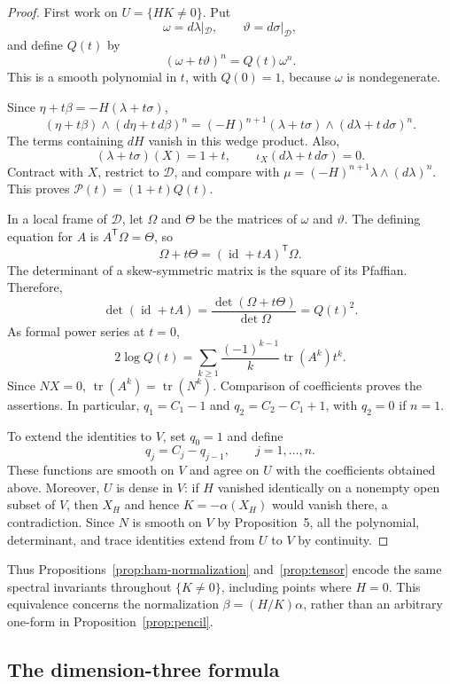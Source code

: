 \documentclass[11pt,a4paper]{article}
\numberwithin{equation}{section}
\theoremstyle{definition}
\theoremstyle{remark}
\newcommand{\id}{\operatorname{id}}
\newcommand{\tr}{\operatorname{tr}}
\begin{document}
\begin{proof}
First work on $U=\lbrace HK\neq 0\rbrace$.
Put
\[
\omega=d\lambda|_{\mathcal D},\qquad
\vartheta=d\sigma|_{\mathcal D},
\]
and define $Q(t)$ by
\[
(\omega+t\vartheta)^n=Q(t)\omega^n.
\]
This is a smooth polynomial in $t$, with $Q(0)=1$,
because $\omega$ is nondegenerate.

Since $\eta+t\beta=-H(\lambda+t\sigma)$,
\[
(\eta+t\beta)\wedge(d\eta+t\,d\beta)^n
=(-H)^{n+1}
(\lambda+t\sigma)\wedge(d\lambda+t\,d\sigma)^n.
\]
The terms containing $dH$ vanish in this wedge product.
Also,
\[
(\lambda+t\sigma)(X)=1+t,\qquad
\iota_X(d\lambda+t\,d\sigma)=0.
\]
Contract with $X$, restrict to $\mathcal D$, and compare
with $\mu=(-H)^{n+1}\lambda\wedge(d\lambda)^n$.
This proves $\mathcal P(t)=(1+t)Q(t)$.

In a local frame of $\mathcal D$, let $\Omega$ and
$\Theta$ be the matrices of $\omega$ and $\vartheta$.
The defining equation for $A$ is
$A^{\mathsf T}\Omega=\Theta$, so
\[
\Omega+t\Theta=(\id+tA)^{\mathsf T}\Omega.
\]
The determinant of a skew-symmetric matrix is the
square of its Pfaffian. Therefore,
\[
\det(\id+tA)
=\frac{\det(\Omega+t\Theta)}{\det\Omega}
=Q(t)^2.
\]
As formal power series at $t=0$,
\[
2\log Q(t)
=\sum_{k\geq1}\frac{(-1)^{k-1}}{k}
\tr(A^k)t^k.
\]
Since $NX=0$, $\tr(A^k)=\tr(N^k)$.
Comparison of coefficients proves the assertions.
In particular, $q_1=C_1-1$ and
$q_2=C_2-C_1+1$, with $q_2=0$ if $n=1$.

To extend the identities to $V$, set $q_0=1$ and define
\[
q_j=C_j-q_{j-1},\qquad j=1,\ldots,n.
\]
These functions are smooth on $V$ and agree on $U$ with
the coefficients obtained above. Moreover, $U$ is dense
in $V$: if $H$ vanished identically on a nonempty open
subset of $V$, then $X_H$ and hence
$K=-\alpha(X_H)$ would vanish there, a contradiction.
Since $N$ is smooth on $V$ by Proposition~5, all the
polynomial, determinant, and trace identities extend
from $U$ to $V$ by continuity.
\end{proof}

Thus Propositions~\ref{prop:ham-normalization}
and~\ref{prop:tensor} encode the same spectral
invariants throughout $\{K\neq0\}$, including points
where $H=0$. This equivalence concerns the normalization
$\beta=(H/K)\alpha$, rather than an arbitrary one-form
in Proposition~\ref{prop:pencil}.



\subsection{The dimension-three formula}
\end{document}
